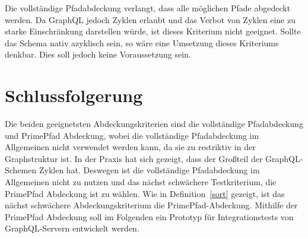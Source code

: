 Die vollständige Pfadabdeckung verlangt, dass alle möglichen Pfade abgedeckt werden.
Da GraphQL jedoch Zyklen erlaubt und das Verbot von Zyklen eine zu starke Einschränkung darstellen würde, ist dieses Kriterium nicht geeignet.
Sollte das Schema nativ azyklisch sein, so wäre eine Umsetzung dieses Kriteriums denkbar.
Dies soll jedoch keine Voraussetzung sein.

\section{Schlussfolgerung}
\label{fazitcov}

Die beiden geeignetsten Abdeckungskriterien sind die vollständige Pfadabdeckung und PrimePfad Abdeckung, wobei die vollständige Pfadabdeckung im
Allgemeinen nicht verwendet werden kann, da sie zu restriktiv in der Graphstruktur ist.
In der Praxis hat sich gezeigt, dass der Großteil der GraphQL-Schemen Zyklen hat.
Deswegen ist die vollständige Pfadabdeckung im Allgemeinen nicht zu nutzen und das nächst schwächere Testkriterium, die PrimePfad Abdeckung ist zu wählen.
Wie in Definition~\ref{sort} gezeigt, ist das nächst schwächere Abdeckungskriterium die PrimePfad-Abdeckung.
Mithilfe der PrimePfad Abdeckung soll im Folgenden ein Prototyp für Integrationstests von GraphQL-Servern entwickelt werden.




